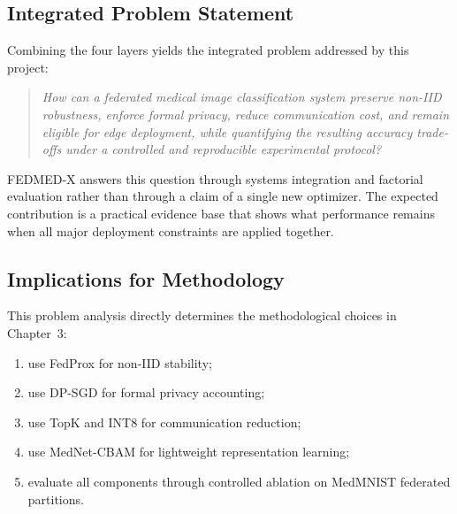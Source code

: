 \subsection{Integrated Problem Statement}
Combining the four layers yields the integrated problem addressed by this
project:

\begin{quote}\itshape
How can a federated medical image classification system preserve non-IID
robustness, enforce formal privacy, reduce communication cost, and remain
eligible for edge deployment, while quantifying the resulting accuracy
trade-offs under a controlled and reproducible experimental protocol?
\end{quote}

FEDMED-X answers this question through systems integration and factorial
evaluation rather than through a claim of a single new optimizer. The
expected contribution is a practical evidence base that shows what
performance remains when all major deployment constraints are applied
together.

\subsection{Implications for Methodology}
This problem analysis directly determines the methodological choices in
Chapter~3:
\begin{enumerate}[leftmargin=*]
  \item use FedProx for non-IID stability;
  \item use DP-SGD for formal privacy accounting;
  \item use TopK and INT8 for communication reduction;
  \item use MedNet-CBAM for lightweight representation learning;
  \item evaluate all components through controlled ablation on MedMNIST
        federated partitions.
\end{enumerate}

